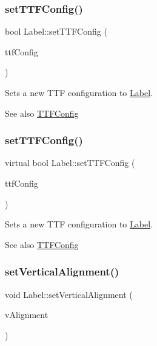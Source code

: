 \subsubsection{\texorpdfstring{set\+T\+T\+F\+Config()}{setTTFConfig()}\hspace{0.1cm}{\footnotesize\ttfamily [1/2]}}
{\footnotesize\ttfamily bool Label\+::set\+T\+T\+F\+Config (\begin{DoxyParamCaption}\item[{const \hyperlink{structTTFConfig}{T\+T\+F\+Config} \&}]{ttf\+Config }\end{DoxyParamCaption})\hspace{0.3cm}{\ttfamily [virtual]}}

Sets a new T\+TF configuration to \hyperlink{classLabel}{Label}. \begin{DoxySeeAlso}{See also}
{\ttfamily \hyperlink{structTTFConfig}{T\+T\+F\+Config}} 
\end{DoxySeeAlso}
\mbox{\label{classLabel_a7e5006e20e63259ffefd217405e83efd}} 
\subsubsection{\texorpdfstring{set\+T\+T\+F\+Config()}{setTTFConfig()}\hspace{0.1cm}{\footnotesize\ttfamily [2/2]}}
{\footnotesize\ttfamily virtual bool Label\+::set\+T\+T\+F\+Config (\begin{DoxyParamCaption}\item[{const \hyperlink{structTTFConfig}{T\+T\+F\+Config} \&}]{ttf\+Config }\end{DoxyParamCaption})\hspace{0.3cm}{\ttfamily [virtual]}}

Sets a new T\+TF configuration to \hyperlink{classLabel}{Label}. \begin{DoxySeeAlso}{See also}
{\ttfamily \hyperlink{structTTFConfig}{T\+T\+F\+Config}} 
\end{DoxySeeAlso}
\mbox{\label{classLabel_a97b358d0917e0a70b16146ec3a105d42}} 
\subsubsection{\texorpdfstring{set\+Vertical\+Alignment()}{setVerticalAlignment()}\hspace{0.1cm}{\footnotesize\ttfamily [1/2]}}
{\footnotesize\ttfamily void Label\+::set\+Vertical\+Alignment (\begin{DoxyParamCaption}\item[{Text\+V\+Alignment}]{v\+Alignment }\end{DoxyParamCaption})\hspace{0.3cm}{\ttfamily [inline]}}

